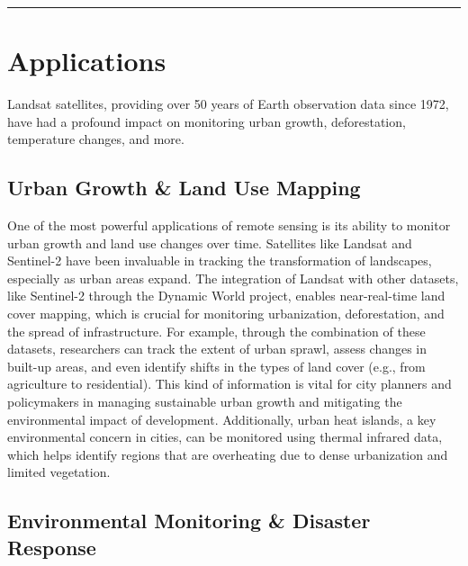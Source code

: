 \documentclass[
  letterpaper,
  DIV=11,
  numbers=noendperiod]{scrreprt}
\begin{document}
\begin{center}\rule{0.5\linewidth}{0.5pt}\end{center}

\section{Applications}\label{applications-1}

Landsat satellites, providing over 50 years of Earth observation data
since 1972, have had a profound impact on monitoring urban growth,
deforestation, temperature changes, and more.

\subsection{Urban Growth \& Land Use
Mapping}\label{urban-growth-land-use-mapping}

One of the most powerful applications of remote sensing is its ability
to monitor urban growth and land use changes over time. Satellites like
Landsat and Sentinel-2 have been invaluable in tracking the
transformation of landscapes, especially as urban areas expand. The
integration of Landsat with other datasets, like Sentinel-2 through the
Dynamic World project, enables near-real-time land cover mapping, which
is crucial for monitoring urbanization, deforestation, and the spread of
infrastructure. For example, through the combination of these datasets,
researchers can track the extent of urban sprawl, assess changes in
built-up areas, and even identify shifts in the types of land cover
(e.g., from agriculture to residential). This kind of information is
vital for city planners and policymakers in managing sustainable urban
growth and mitigating the environmental impact of development.
Additionally, urban heat islands, a key environmental concern in cities,
can be monitored using thermal infrared data, which helps identify
regions that are overheating due to dense urbanization and limited
vegetation.

\subsection{Environmental Monitoring \& Disaster
Response}\label{environmental-monitoring-disaster-response}
\end{document}
